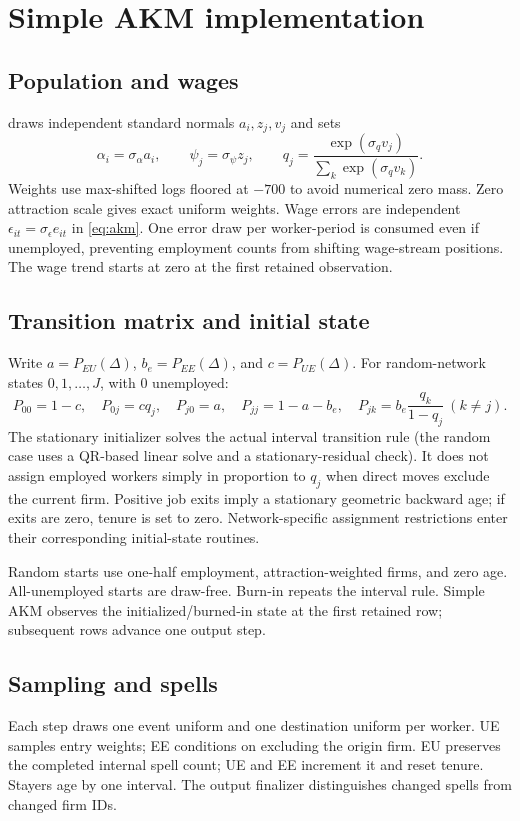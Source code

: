 \documentclass[11pt,letterpaper]{article}
\newcommand{\code}[1]{\texttt{\detokenize{#1}}}
\begin{document}
\section{Simple AKM implementation}\label{app:akm}
\subsection{Population and wages}
\code{src/fesim_akm_simple.mata} draws independent standard normals
$a_i,z_j,v_j$ and sets
\[
\alpha_i=\sigma_\alpha a_i,\qquad
\psi_j=\sigma_\psi z_j,\qquad
q_j=\frac{\exp(\sigma_qv_j)}{\sum_k\exp(\sigma_qv_k)}.
\]
Weights use max-shifted logs floored at $-700$ to avoid numerical zero
mass. Zero attraction scale gives exact uniform weights. Wage errors
are independent $\epsilon_{it}=\sigma_\epsilon e_{it}$ in \eqref{eq:akm}.
One error draw per worker-period is consumed even if unemployed, preventing
employment counts from shifting wage-stream positions. The wage trend
starts at zero at the first retained observation.

\subsection{Transition matrix and initial state}
Write $a=P_{EU}(\Delta)$, $b_e=P_{EE}(\Delta)$, and $c=P_{UE}(\Delta)$.
For random-network states $0,1,\ldots,J$, with 0 unemployed:
\[
P_{00}=1-c,\quad P_{0j}=cq_j,\quad P_{j0}=a,\quad
P_{jj}=1-a-b_e,\quad P_{jk}=b_e\frac{q_k}{1-q_j}\ (k\ne j).
\]
The stationary initializer solves the actual interval transition rule
(the random case uses a QR-based linear solve and a stationary-residual
check). It does not assign employed workers simply in proportion to $q_j$
when direct moves exclude the current firm. Positive job exits imply a
stationary geometric backward age; if exits are zero, tenure is set to
zero. Network-specific assignment restrictions enter their corresponding
initial-state routines.

Random starts use one-half employment, attraction-weighted firms, and zero
age. All-unemployed starts are draw-free. Burn-in repeats the interval
rule. Simple AKM observes the initialized/burned-in state at the first
retained row; subsequent rows advance one output step.

\subsection{Sampling and spells}
Each step draws one event uniform and one destination uniform per worker.
UE samples entry weights; EE conditions on excluding the origin firm.
EU preserves the completed internal spell count; UE and EE increment it
and reset tenure. Stayers age by one interval. The output finalizer
distinguishes changed spells from changed firm IDs.
\end{document}
